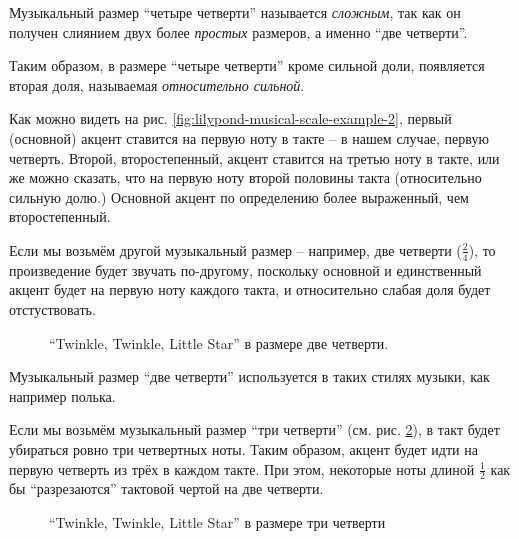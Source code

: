 \documentclass[a4paper,twoside]{book}
\begin{document}
Музыкальный размер ``четыре четверти'' называется \emph{сложным}, так как он
получен слиянием двух более \emph{простых} размеров, а именно ``две четверти''.

Таким образом, в размере ``четыре четверти'' кроме сильной доли, появляется
вторая доля, называемая \emph{относительно сильной}.

Как можно видеть на рис. \ref{fig:lilypond-musical-scale-example-2}, первый
(основной) акцент ставится на первую ноту в такте -- в нашем случае, первую
четверть.  Второй, второстепенный, акцент ставится на третью ноту в такте, или
же можно сказать, что на первую ноту второй половины такта (относительно сильную
долю.)  Основной акцент по определению более выраженный, чем второстепенный.

Если мы возьмём другой музыкальный размер -- например, две четверти
($\frac{2}{4}$), то произведение будет звучать по-другому, поскольку основной и
единственный акцент будет на первую ноту каждого такта, и относительно слабая
доля будет отстуствовать.

\begin{figure}[ht]
  \caption{``Twinkle, Twinkle, Little Star'' в размере две четверти.}
  \centering
  \label{fig:lilypond-musical-scale-example-3}
\end{figure}

Музыкальный размер ``две четверти'' используется в таких стилях музыки, как
например полька.

Если мы возьмём музыкальный размер ``три четверти''
(см. рис. \ref{fig:lilypond-musical-scale-example-4}), в такт будет убираться
ровно три четвертных ноты.  Таким образом, акцент будет идти на первую четверть
из трёх в каждом такте.  При этом, некоторые ноты длиной $\frac{1}{2}$ как бы
``разрезаются'' тактовой чертой на две четверти.

\begin{figure}[ht]
  \caption{``Twinkle, Twinkle, Little Star'' в размере три четверти}
  \centering
  \label{fig:lilypond-musical-scale-example-4}
\end{figure}
\end{document}
